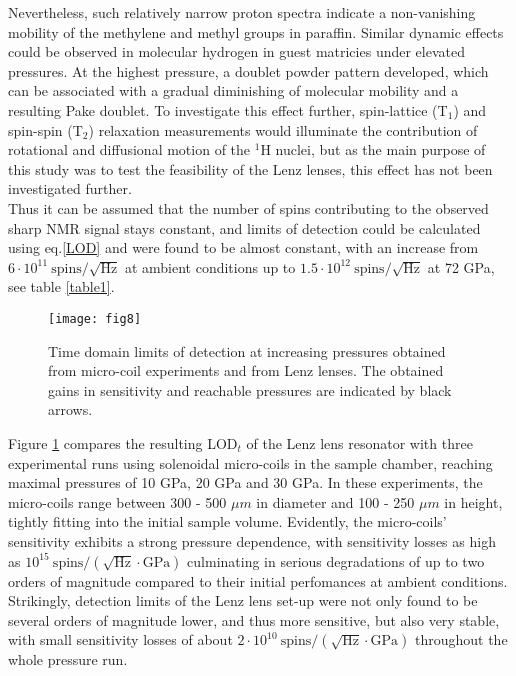 \documentclass[aip,rsi,reprint,graphicx]{revtex4-1} %
\begin{document}
Nevertheless, such relatively narrow proton spectra indicate a non-vanishing mobility of the methylene and methyl groups in paraffin. Similar dynamic effects could be observed in molecular hydrogen in guest matricies under elevated pressures\cite{Okuchi2005a, Okuchi2007, Okuchi2011}. At the highest pressure, a doublet powder pattern developed, which can be associated with a gradual diminishing of molecular mobility and a resulting Pake doublet\cite{Pake1948}.
To investigate this effect further, spin-lattice (T$_1$) and spin-spin (T$_2$) relaxation measurements would illuminate the contribution of rotational and diffusional motion of the $^1$H nuclei, but as the main purpose of this study was to test the feasibility of the Lenz lenses, this effect has not been investigated further. \\
 Thus it can be assumed that the number of spins contributing to the observed sharp NMR signal stays constant, and limits of detection could be calculated using eq.\ref{LOD} and were found  to be almost constant, with an increase from $6\cdot10^{11} ~\text{spins}/{\sqrt{\text{Hz}}}$ at ambient conditions up to $1.5\cdot10^{12}~\text{spins}/{\sqrt{\text{Hz}}}$ at 72 GPa, see table \ref{table1}.\\
 \begin{figure}[htbp]
 \centering
 \texttt{[image: fig8]}%
 \caption{Time domain limits of detection at increasing pressures obtained from micro-coil experiments and from Lenz lenses. The obtained gains in sensitivity and reachable pressures are indicated by black arrows. \label{fig8}}%
 \end{figure}
Figure \ref{fig8} compares the resulting LOD$_t$ of the Lenz lens resonator with three experimental runs using solenoidal micro-coils in the sample chamber, reaching maximal pressures of 10 GPa\cite{Meissner2014}, 20 GPa\cite{Meier2015} and 30 GPa\cite{Meier2015a}. 
In these experiments, the micro-coils range between 300 \-- 500 $\mu m$ in diameter and 100 \-- 250 $\mu m$ in height, tightly fitting into the initial sample volume. Evidently, the micro-coils' sensitivity exhibits a strong pressure dependence, with sensitivity losses as high as $10^{15}~\text{spins}/(\sqrt{\text{Hz}}\cdot \text{GPa})$ culminating in serious degradations of up to two orders of magnitude compared to their initial perfomances at ambient conditions. \\
Strikingly, detection limits of the Lenz lens set-up were not only found to be several orders of magnitude lower, and thus more sensitive, but also very stable, with small sensitivity losses of about $2\cdot 10^{10} ~\text{spins}/(\sqrt{\text{Hz}}\cdot \text{GPa})$ throughout the whole pressure run.\\
\end{document}
